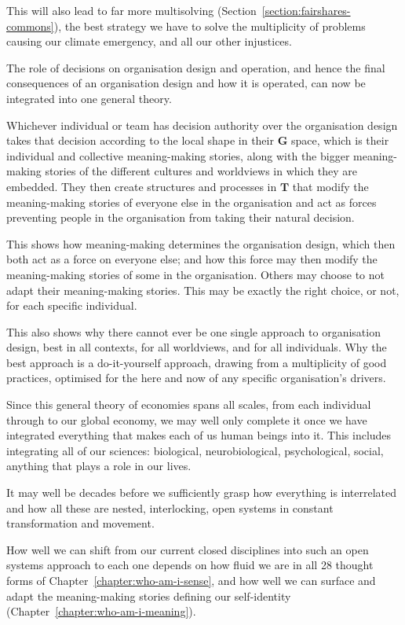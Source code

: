 This will also lead to far more multisolving\cite{sawin-multisolving} (Section~\ref{section:fairshares-commons}), the best strategy we have to solve the multiplicity of problems causing our climate emergency, and all our other injustices.


The role of decisions on organisation design and operation, and hence the final consequences of an organisation design and how it is operated, can now be integrated into one general theory. 


Whichever individual or team has decision authority over the organisation design takes that decision according to the local shape in their $\textbf{G}$ space, which is their individual and collective meaning\hyp{}making stories, along with the bigger meaning\hyp{}making stories of the different cultures and worldviews in which they are embedded. They then create structures and processes in $\textbf{T}$ that modify the meaning\hyp{}making stories of everyone else in the organisation and act as forces preventing people in the organisation from taking their natural decision.


This shows how meaning\hyp{}making determines the organisation design, which then both act as a force on everyone else; and how this force may then modify the meaning\hyp{}making stories of some in the organisation. Others may choose to not adapt their meaning\hyp{}making stories. This may be exactly the right choice, or not, for each specific individual.


This also shows why there cannot ever be one single approach to organisation design, best in all contexts, for all worldviews, and for all individuals. Why the best approach is a do\hyp{}it\hyp{}yourself approach, drawing from a multiplicity of good practices, optimised for the here and now of any specific organisation’s drivers.


Since this general theory of economies  spans all scales, from each individual through to our global economy, we may well only complete it once we have integrated everything that makes each of us human beings into it. This includes integrating all of our sciences: biological, neurobiological, psychological, social, anything that plays a role in our lives.


It may well be decades before we sufficiently grasp how everything is interrelated and how all these are nested, interlocking, open systems in constant transformation and movement. 


How well we can shift from our current closed disciplines into such an open systems approach to each one depends on how fluid we are in all 28 thought forms  of Chapter~\ref{chapter:who-am-i-sense}, and how well we can surface and adapt the meaning\hyp{}making stories defining our self\hyp{}identity (Chapter~\ref{chapter:who-am-i-meaning}). 




